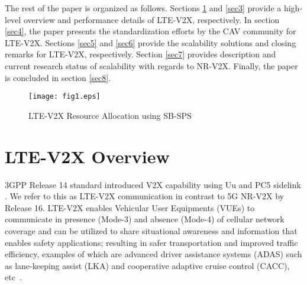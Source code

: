 \documentclass[iicol]{sn-jnl}%
\theoremstyle{thmstyleone}%
\theoremstyle{thmstyletwo}%
\theoremstyle{thmstylethree}%
\begin{document}
The rest of the paper is organized as follows. Sections \ref{sec2} and \ref{sec3} provide a high-level overview and performance details of LTE-V2X, respectively. In section \ref{sec4}, the paper presents the standardization efforts by the CAV community for LTE-V2X. Sections \ref{sec5} and \ref{sec6} provide the scalability solutions and closing remarks for LTE-V2X, respectively.
Section \ref{sec7} provides description and current research status of scalability with regards to NR-V2X. Finally, the paper is concluded in section \ref{sec8}.


\begin{figure}[b]
\centerline{\texttt{[image: fig1.eps]}}
\caption{LTE-V2X Resource Allocation using SB-SPS}
\label{fig:SPS}
\end{figure}


\section{LTE-V2X Overview}\label{sec2}
3GPP Release 14 standard introduced V2X capability using Uu and PC5 sidelink \cite{molina2017lte}. We refer to this as LTE-V2X communication in contrast to 5G NR-V2X by Release 16. LTE-V2X enables Vehicular User Equipments (VUEs) to communicate in presence (Mode-3) and absence (Mode-4) of cellular network coverage and can be utilized to share situational awareness and information that enables safety applications; resulting in safer transportation and improved traffic efficiency, examples of which are advanced driver assistance systems (ADAS) such as lane-keeping assist (LKA) and cooperative adaptive cruise control (CACC), etc~\cite{vukadinovic20183gpp, shah2022enabling,shah2023arow}.
\end{document}
